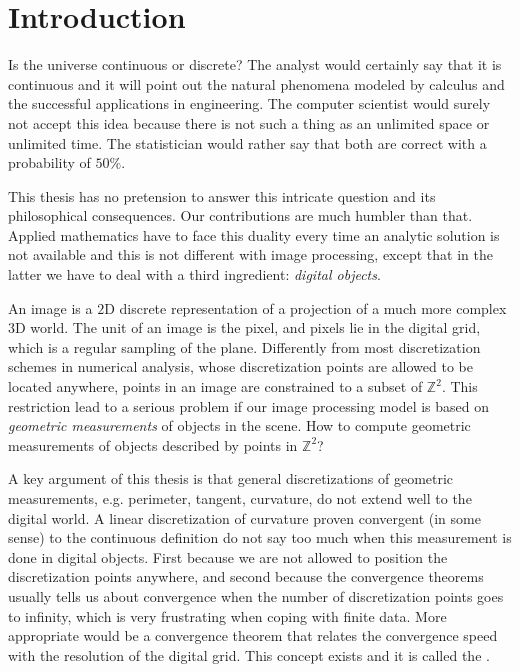 \chapter*{Introduction}\label{chapter:introduction}


Is the universe continuous or discrete? The analyst would certainly say that it is continuous and it will point out the natural phenomena modeled by calculus and the successful applications in engineering. The computer scientist would surely not accept this idea because there is not such a thing as an unlimited space or unlimited time. The statistician would rather say that both are correct with a probability of $50\%$.

This thesis has no pretension to answer this intricate question and its philosophical consequences. Our contributions are much humbler than that. Applied mathematics have to face this duality every time an analytic solution is not available and this is not different with image processing, except that in the latter we have to deal with a third ingredient: \emph{digital objects}.

An image is a $2$D discrete representation of a projection of a much more complex $3$D world. The unit of an image is the pixel, and pixels lie in the digital grid, which is a regular sampling of the plane. Differently from most discretization schemes in numerical analysis, whose discretization points are allowed to be located anywhere, points in an image are constrained to a subset of $\mathbb{Z}^2$. This restriction lead to a serious problem if our image processing model is based on \emph{geometric measurements} of objects in the scene. How to compute geometric measurements of objects described by points in $\mathbb{Z}^2$?

A key argument of this thesis is that general discretizations of geometric measurements, e.g. perimeter, tangent, curvature, do not extend well to the digital world. A linear discretization of curvature proven convergent (in some sense) to the continuous definition do not say too much when this measurement is done in digital objects. First because we are not allowed to position the discretization points anywhere, and second because the convergence theorems usually tells us about convergence when the number of discretization points goes to infinity, which is very frustrating when coping with finite data. More appropriate would be a convergence theorem that relates the convergence speed with the resolution of the digital grid. This concept exists and it is called the .

